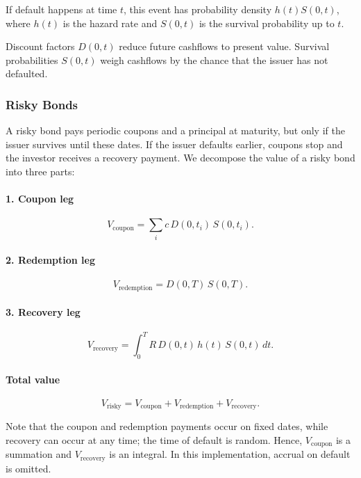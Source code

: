 If default happens at time $t$, this event has probability density $h(t) S(0,t)$, where $h(t)$ is the hazard rate and $S(0,t)$ is the survival probability up to $t$.  

Discount factors $D(0,t)$ reduce future cashflows to present value. Survival probabilities $S(0,t)$ weigh cashflows by the chance that the issuer has not defaulted.

\subsubsection*{Risky Bonds}

A risky bond pays periodic coupons and a principal at maturity, but only if the issuer survives until these dates. If the issuer defaults earlier, coupons stop and the investor receives a recovery payment. We decompose the value of a risky bond into three parts:

\paragraph{1. Coupon leg}
\[
V_{\text{coupon}} = \sum_{i} c\,D(0,t_i)\,S(0,t_i).
\]

\paragraph{2. Redemption leg}
\[
V_{\text{redemption}} = D(0,T)\,S(0,T).
\]

\paragraph{3. Recovery leg}
\[
V_{\text{recovery}}
= \int_0^T R\,D(0,t)\,h(t)\,S(0,t)\,dt.
\]

\paragraph{Total value}
\[
V_{\text{risky}} = V_{\text{coupon}} + V_{\text{redemption}} + V_{\text{recovery}}.
\]

Note that the coupon and redemption payments occur on fixed dates, while recovery can occur at any time; the time of default is random. Hence, $V_{\text{coupon}}$ is a summation and $V_{\text{recovery}}$ is an integral. In this implementation, accrual on default is omitted. 


